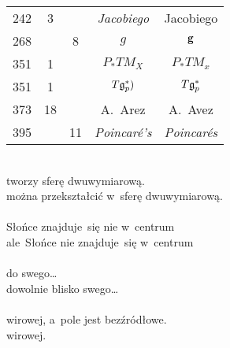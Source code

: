 \documentclass[a4paper,11pt]{article}
\begin{document}
\begin{center}
\begin{tabular}{|c|c|c|c|c|}
    242 &  3 & & \textit{Jacobiego} & Jacobiego \\
    268 & &  8 & $g$ & $\mathbf{g}$ \\
    351 &  1 & & $P_{ * }TM_{ X }$ & $P_{ * }TM_{ x }$ \\
    351 &  1 & & $T\mathfrak{g}_{ p }^{ * })$ & $T\mathfrak{g}_{ p }^{ * }$ \\
    373 & 18 & & A.~Arez & A.~Avez \\
    395 & & 11 & \textit{Poincar\'{e}'s} & \textit{Poincar\'{e}s} \\
    \hline
  \end{tabular}

\end{center}

\vspace{\spaceTwo}


\noindent
{} \\
\Jest  tworzy sferę dwuwymiarową. \\
\Powin można przekształcić w~sferę dwuwymiarową. \\
 \\
\Jest  Słońce znajduje~się nie w~centrum \\
\Powin ale~Słońce nie znajduje~się w~centrum \\
 \\
\Jest  do swego\ldots \\
\Powin dowolnie blisko swego\ldots \\
 \\
\Jest  wirowej, a~pole jest bezźródłowe. \\
\Powin wirowej. \\
\end{document}
